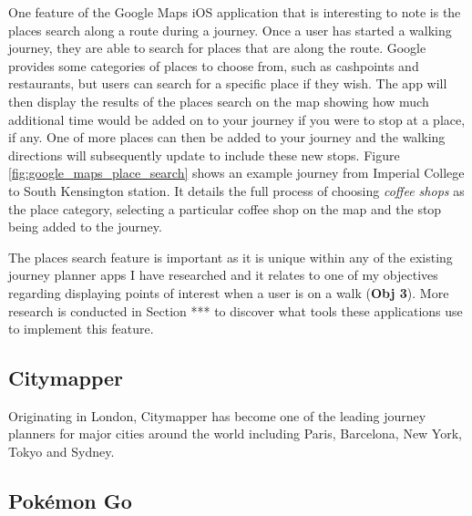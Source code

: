 One feature of the Google Maps iOS application that is interesting to note is the places search along a route during a journey. Once a user has started a walking journey, they are able to search for places that are along the route. Google provides some categories of places to choose from, such as cashpoints and restaurants, but users can search for a specific place if they wish. The app will then display the results of the places search on the map showing how much additional time would be added on to your journey if you were to stop at a place, if any. One of more places can then be added to your journey and the walking directions will subsequently update to include these new stops. Figure \ref{fig:google_maps_place_search} shows an example journey from Imperial College to South Kensington station. It details the full process of choosing \textit{coffee shops} as the place category, selecting a particular coffee shop on the map and the stop being added to the journey.

The places search feature is important as it is unique within any of the existing journey planner apps I have researched and it relates to one of my objectives regarding displaying points of interest when a user is on a walk (\textbf{Obj 3}). More research is conducted in Section *** to discover what tools these applications use to implement this feature.

\subsection{Citymapper}

Originating in London, Citymapper \cite{Citymapper} has become one of the leading journey planners for major cities around the world including Paris, Barcelona, New York, Tokyo and Sydney. 

\subsection{Pok\'{e}mon Go}




